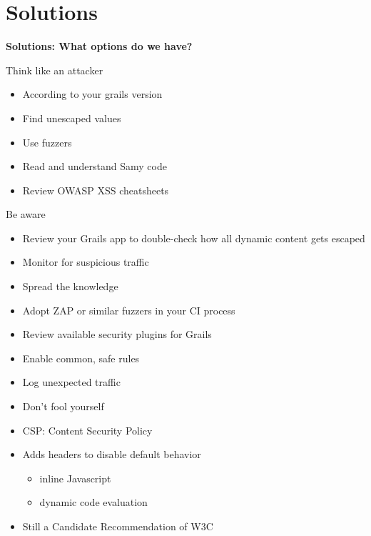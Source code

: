 
\section{Solutions}

\begin{frame}[plain]
    \begin{center}
      \Huge\bfseries
      Solutions: What options do we have?
    \end{center}
\end{frame}

\begin{frame}[plain]{Think like an attacker}
  \begin{itemize}
    \item According to your grails version
    \item Find unescaped values
    \item Use fuzzers
    \item Read and understand Samy code
    \item Review OWASP XSS cheatsheets
  \end{itemize}
\end{frame}

\begin{frame}[plain]{Be aware}
  \begin{itemize}
    \item Review your Grails app to double-check how all dynamic content gets escaped
    \item Monitor for suspicious traffic
    \item Spread the knowledge
    \item Adopt ZAP or similar fuzzers in your CI process
    \item Review available security plugins for Grails
  \end{itemize}
\end{frame}

\begin{frame}[plain]
 \begin{itemize}[<+-| alert@+>]
   \item Enable common, safe rules
   \item Log unexpected traffic
   \item Don't fool yourself
 \end{itemize}
\end{frame}

\begin{frame}[plain]
 \begin{itemize}
  \item CSP: Content Security Policy
  \item Adds headers to disable default behavior
   \begin{itemize}
     \item inline Javascript
     \item dynamic code evaluation
   \end{itemize}
  \item Still a Candidate Recommendation of W3C
 \end{itemize}
\end{frame}
